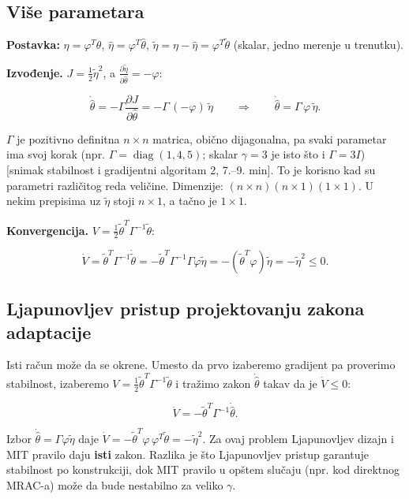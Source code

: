 \documentclass[11pt,a4paper,parskip=half,headsepline,numbers=noenddot]{scrartcl}
\DeclareRobustCommand{\izvor}[1]{{\small\color{izvorC}[#1]}}
\begin{document}
\subsection{Više parametara}

\textbf{Postavka:} \(\eta = \varphi^T\theta\), \(\hat\eta = \varphi^T\hat\theta\), \(\tilde\eta = \eta - \hat\eta = \varphi^T\tilde\theta\) (skalar, jedno merenje u trenutku).

\textbf{Izvođenje.} \(J = \frac12\tilde\eta^2\), a \(\frac{\partial\tilde\eta}{\partial\hat\theta} = -\varphi\):

\[\dot{\hat\theta} = -\Gamma\frac{\partial J}{\partial\hat\theta} = -\Gamma\,(-\varphi)\,\tilde\eta\qquad\Rightarrow\qquad \dot{\hat\theta} = \Gamma\,\varphi\,\tilde\eta .\]

\(\Gamma\) je pozitivno definitna \(n\times n\) matrica, obično dijagonalna, pa svaki parametar ima svoj korak (npr. \(\Gamma = \operatorname{diag}(1, 4, 5)\); skalar \(\gamma = 3\) je isto što i \(\Gamma = 3I\)) \izvor{snimak stabilnost i gradijentni algoritam 2, 7.--9. min}. To je korisno kad su parametri različitog reda veličine. Dimenzije: \((n\times n)(n\times 1)(1\times 1)\). U nekim prepisima uz \(\tilde\eta\) stoji \(n\times 1\), a tačno je \(1\times 1\).

\textbf{Konvergencija.} \(V = \frac12\tilde\theta^T\Gamma^{-1}\tilde\theta\):

\[\dot V = \tilde\theta^T\Gamma^{-1}\dot{\tilde\theta} = -\tilde\theta^T\Gamma^{-1}\Gamma\varphi\tilde\eta = -(\tilde\theta^T\varphi)\tilde\eta = -\tilde\eta^2 \le 0 .\]

\subsection{Ljapunovljev pristup projektovanju zakona adaptacije}

Isti račun može da se okrene. Umesto da prvo izaberemo gradijent pa proverimo stabilnost, izaberemo \(V = \frac12\tilde\theta^T\Gamma^{-1}\tilde\theta\) i tražimo zakon \(\dot{\hat\theta}\) takav da je \(\dot V \le 0\):

\[\dot V = -\tilde\theta^T\Gamma^{-1}\dot{\hat\theta} .\]

Izbor \(\dot{\hat\theta} = \Gamma\varphi\tilde\eta\) daje \(\dot V = -\tilde\theta^T\varphi\,\varphi^T\tilde\theta = -\tilde\eta^2\). Za ovaj problem Ljapunovljev dizajn i MIT pravilo daju \textbf{isti} zakon. Razlika je što Ljapunovljev pristup garantuje stabilnost po konstrukciji, dok MIT pravilo u opštem slučaju (npr. kod direktnog MRAC-a) može da bude nestabilno za veliko \(\gamma\).
\end{document}
